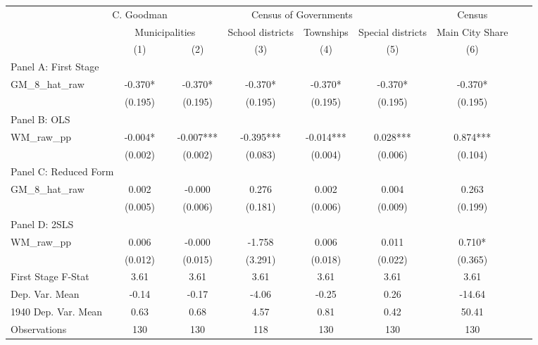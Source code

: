  \begin{tabular}{l*{8}{c}} \toprule
&\multicolumn{1}{c}{C. Goodman}&\multicolumn{4}{c}{Census of Governments}&\multicolumn{1}{c}{Census}\\\cmidrule(lr){2-2}\cmidrule(lr){3-6}\cmidrule(lr){7-7}
&\multicolumn{2}{c}{Municipalities}&\multicolumn{1}{c}{School districts}&\multicolumn{1}{c}{Townships}&\multicolumn{1}{c}{Special districts}&\multicolumn{1}{c}{Main City Share}\\\cmidrule(lr){2-3}\cmidrule(lr){4-6}\cmidrule(lr){7-7}
&\multicolumn{1}{c}{(1)}&\multicolumn{1}{c}{(2)}&\multicolumn{1}{c}{(3)}&\multicolumn{1}{c}{(4)}&\multicolumn{1}{c}{(5)}&\multicolumn{1}{c}{(6)}\\
\cmidrule(lr){1-7}
\multicolumn{6}{l}{Panel A: First Stage}\\
\cmidrule(lr){1-7}
GM\_8\_hat\_raw    &   -0.370*  &   -0.370*  &   -0.370*  &   -0.370*  &   -0.370*  &   -0.370*  \\
                &  (0.195)   &  (0.195)   &  (0.195)   &  (0.195)   &  (0.195)   &  (0.195)   \\
\cmidrule(lr){1-7}
\multicolumn{6}{l}{Panel B: OLS}\\
\cmidrule(lr){1-7}
WM\_raw\_pp       &   -0.004*  &   -0.007***&   -0.395***&   -0.014***&    0.028***&    0.874***\\
                &  (0.002)   &  (0.002)   &  (0.083)   &  (0.004)   &  (0.006)   &  (0.104)   \\
\cmidrule(lr){1-7}
\multicolumn{6}{l}{Panel C: Reduced Form}\\
\cmidrule(lr){1-7}
GM\_8\_hat\_raw    &    0.002   &   -0.000   &    0.276   &    0.002   &    0.004   &    0.263   \\
                &  (0.005)   &  (0.006)   &  (0.181)   &  (0.006)   &  (0.009)   &  (0.199)   \\
\cmidrule(lr){1-7}
\multicolumn{6}{l}{Panel D: 2SLS}\\
\cmidrule(lr){1-7}
WM\_raw\_pp       &    0.006   &   -0.000   &   -1.758   &    0.006   &    0.011   &    0.710*  \\
                &  (0.012)   &  (0.015)   &  (3.291)   &  (0.018)   &  (0.022)   &  (0.365)   \\
\midrule
First Stage F-Stat&     3.61   &     3.61   &     3.61   &     3.61   &     3.61   &     3.61   \\
Dep. Var. Mean  &    -0.14   &    -0.17   &    -4.06   &    -0.25   &     0.26   &   -14.64   \\
1940 Dep. Var. Mean&     0.63   &     0.68   &     4.57   &     0.81   &     0.42   &    50.41   \\
Observations    &      130   &      130   &      118   &      130   &      130   &      130   \\
 \bottomrule \end{tabular}

